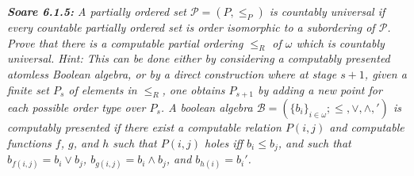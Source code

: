 \documentclass{article}
\begin{document}
\it \textbf{Soare 6.1.5:} A partially ordered set $\mathcal{P}=(P,\leq_P)$
  is countably universal if every countable partially ordered set is order
  isomorphic to a subordering of $\mathcal{P}$. Prove that there is a
  computable partial ordering $\leq_R$ of $\omega$ which is countably
  universal. Hint: This can be done either by considering a computably
  presented atomless Boolean algebra, or by a direct construction where at
  stage $s+1$, given a finite set $P_s$ of elements in $\leq_R$, one
  obtains $P_{s+1}$ by adding a new point for each possible order type over
  $P_s$. A boolean algebra
  $\mathcal{B}=(\{b_i\}_{i\in\omega};\leq,\vee,\wedge,')$ is computably
  presented if there exist a computable relation $P(i,j)$ and computable
  functions $f$, $g$, and $h$ such that $P(i,j)$ holes iff $b_i\leq b_j$,
  and such that $b_{f(i,j)}=b_i\vee b_j$, $b_{g(i,j)}=b_i\wedge b_j$, and
  $b_{h(i)}=b_i'$.
\end{document}
